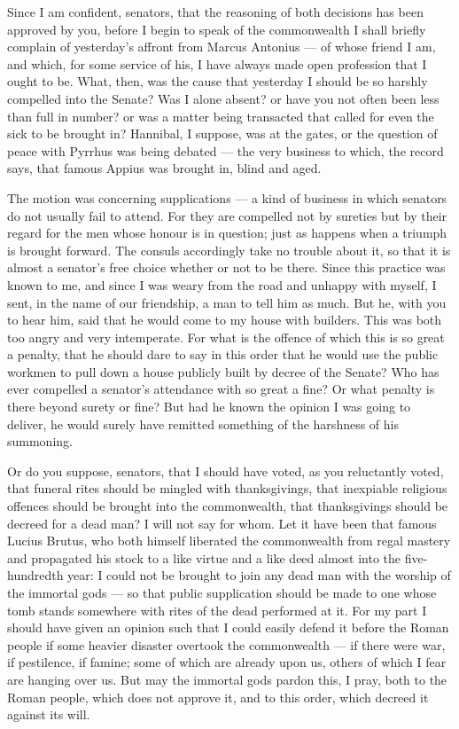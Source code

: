 Since I am confident, senators, that the reasoning of both decisions has been approved by you, before I begin to speak of the commonwealth I shall briefly complain of yesterday's affront from Marcus Antonius --- of whose friend I am, and which, for some service of his, I have always made open profession that I ought to be. What, then, was the cause that yesterday I should be so harshly compelled into the Senate? Was I alone absent? or have you not often been less than full in number? or was a matter being transacted that called for even the sick to be brought in? Hannibal, I suppose, was at the gates, or the question of peace with Pyrrhus was being debated --- the very business to which, the record says, that famous Appius was brought in, blind and aged.

 The motion was concerning supplications --- a kind of business in which senators do not usually fail to attend. For they are compelled not by sureties but by their regard for the men whose honour is in question; just as happens when a triumph is brought forward. The consuls accordingly take no trouble about it, so that it is almost a senator's free choice whether or not to be there. Since this practice was known to me, and since I was weary from the road and unhappy with myself, I sent, in the name of our friendship, a man to tell him as much. But he, with you to hear him, said that he would come to my house with builders. This was both too angry and very intemperate. For what is the offence of which this is so great a penalty, that he should dare to say in this order that he would use the public workmen to pull down a house publicly built by decree of the Senate? Who has ever compelled a senator's attendance with so great a fine? Or what penalty is there beyond surety or fine? But had he known the opinion I was going to deliver, he would surely have remitted something of the harshness of his summoning.

 Or do you suppose, senators, that I should have voted, as you reluctantly voted, that funeral rites should be mingled with thanksgivings, that inexpiable religious offences should be brought into the commonwealth, that thanksgivings should be decreed for a dead man? I will not say for whom. Let it have been that famous Lucius Brutus, who both himself liberated the commonwealth from regal mastery and propagated his stock to a like virtue and a like deed almost into the five-hundredth year: I could not be brought to join any dead man with the worship of the immortal gods --- so that public supplication should be made to one whose tomb stands somewhere with rites of the dead performed at it. For my part I should have given an opinion such that I could easily defend it before the Roman people if some heavier disaster overtook the commonwealth --- if there were war, if pestilence, if famine; some of which are already upon us, others of which I fear are hanging over us. But may the immortal gods pardon this, I pray, both to the Roman people, which does not approve it, and to this order, which decreed it against its will.

